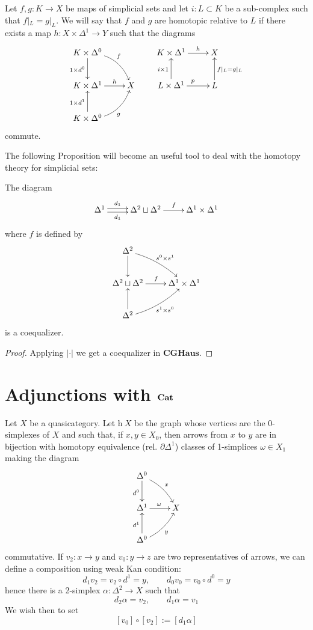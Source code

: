 \begin{refsection}
\begin{defin}
Let $f,g \colon K \to X$ be maps of simplicial sets and let $i \colon L \subset K$ be a sub-complex such that $f |_L = g|_L$. We will say that $f$ and $g$ are homotopic relative to $L$ if there exists a map $h \colon X \times \Delta^1 \to Y$ such that the diagrams
\[
\xymatrix{
K \times \Delta^0 \ar[d]_{1 \times d^0} \ar@/^1pc/[dr]^f \\ K \times \Delta^1 \ar[r]^-h & X \\ K \times \Delta^0 \ar[u]^{1 \times d^1} \ar@/_1pc/[ur]_g
} \qquad \xymatrix{K \times \Delta^1 \ar[r]^-h & X \\ L \times \Delta^1 \ar[u]^{i \times 1} \ar[r]^p & L \ar[u]_{f|_L = g|_L}
}
\]
commute.
\end{defin}



The following Proposition will become an useful tool to deal with the homotopy theory for simplicial sets:

\begin{prop} \label{prop homotopy theory for sset coequalizer}
The diagram
\[
\xymatrix{
\Delta^1 \ar@<.5ex>[r]^-{d_1} \ar@<-.5ex>[r]_-{d_1} & \Delta^2 \sqcup \Delta^2 \ar[r]^f & \Delta^1 \times \Delta^1
}
\]
where $f$ is defined by
\[
\xymatrix{
\Delta^2 \ar[d] \ar@/^.5pc/[dr]^{s^0 \times s^1} \\ \Delta^2 \sqcup \Delta^2 \ar[r]^f & \Delta^1 \times \Delta^1 \\ \Delta^2 \ar[u] \ar@/_.5pc/[ur]_{s^1 \times s^0}
}
\]
is a coequalizer.
\end{prop}

\begin{proof}
Applying $| \cdot |$ we get a coequalizer in $\mathbf{CGHaus}$.
\end{proof}

\section{Adjunctions with \texorpdfstring{$\mathbf{Cat}$}{Cat}}

Let $X$ be a quasicategory. Let $\mathrm h \: X$ be the graph whose vertices are the $0$-simplexes of $X$ and such that, if $x, y \in X_0$, then arrows from $x$ to $y$ are in bijection with homotopy equivalence ($\text{rel. } \partial \Delta^1$) classes of 1-simplices $\omega \in X_1$ making the diagram
\[
\xymatrix{
\Delta^0 \ar[d]_{d^0} \ar@/^.5pc/[dr]^x \\ \Delta^1 \ar[r]^\omega & X \\ \Delta^0 \ar[u]^{d^1} \ar@/_.5pc/[ur]_y
}
\]
commutative. If $v_2 \colon x \to y$ and $v_0 \colon y \to z$ are two representatives of arrows, we can define a composition using weak Kan condition:
\[
d_1 v_2 = v_2 \circ d^1 = y, \qquad d_0 v_0 = v_0 \circ d^0 = y
\]
hence there is a 2-simplex $\alpha \colon \Delta^2 \to X$ such that
\[
d_2 \alpha = v_2, \qquad d_1 \alpha = v_1
\]
We wish then to set
\begin{equation} \label{eq composition fundamental grupoid}
[v_0] \circ [v_2] := [d_1 \alpha]
\end{equation}


\end{refsection}
